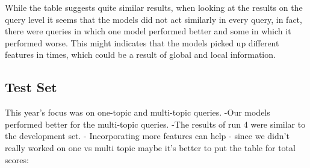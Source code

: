 \documentclass{sig-alternate}
\begin{document}
{\begin{table}[t]
\noindent \begin{centering}
\par\end{centering}
\protect\caption{\label{tab:dev}Development set results.}
\end{table}

While the table suggests quite similar results,
when looking at the results on the query level it seems that the models did not act similarly in every query, in fact, 
there were queries in which one model performed better and some in which it performed worse. This might indicates that the models
picked up different features in times, which could be a result of global and local information. 




\subsection{Test Set}
This year's focus was on one-topic and multi-topic queries. 
\newline-Our models performed better for the multi-topic queries.
\newline-The results of run 4 were similar to the development set.
\newline- Incorporating more features can help
\newline- since we didn't really worked on one vs multi topic maybe it's better to put the table for total scores:

\begin{table}[t]
\noindent \begin{centering}
\par\end{centering}
\protect\caption{\label{tab:dev}Test set results}
\end{table}

}
\end{document}

